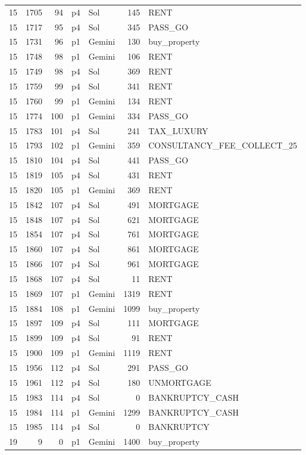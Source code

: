\begin{longtable}{r r r l l r L{2.2in}}
15 & 1705 & 94 & p4 & Sol & 145 & RENT \\
15 & 1717 & 95 & p4 & Sol & 345 & PASS\_GO \\
15 & 1731 & 96 & p1 & Gemini & 130 & buy\_property \\
15 & 1748 & 98 & p1 & Gemini & 106 & RENT \\
15 & 1749 & 98 & p4 & Sol & 369 & RENT \\
15 & 1759 & 99 & p4 & Sol & 341 & RENT \\
15 & 1760 & 99 & p1 & Gemini & 134 & RENT \\
15 & 1774 & 100 & p1 & Gemini & 334 & PASS\_GO \\
15 & 1783 & 101 & p4 & Sol & 241 & TAX\_LUXURY \\
15 & 1793 & 102 & p1 & Gemini & 359 & CONSULTANCY\_FEE\_COLLECT\_25 \\
15 & 1810 & 104 & p4 & Sol & 441 & PASS\_GO \\
15 & 1819 & 105 & p4 & Sol & 431 & RENT \\
15 & 1820 & 105 & p1 & Gemini & 369 & RENT \\
15 & 1842 & 107 & p4 & Sol & 491 & MORTGAGE \\
15 & 1848 & 107 & p4 & Sol & 621 & MORTGAGE \\
15 & 1854 & 107 & p4 & Sol & 761 & MORTGAGE \\
15 & 1860 & 107 & p4 & Sol & 861 & MORTGAGE \\
15 & 1866 & 107 & p4 & Sol & 961 & MORTGAGE \\
15 & 1868 & 107 & p4 & Sol & 11 & RENT \\
15 & 1869 & 107 & p1 & Gemini & 1319 & RENT \\
15 & 1884 & 108 & p1 & Gemini & 1099 & buy\_property \\
15 & 1897 & 109 & p4 & Sol & 111 & MORTGAGE \\
15 & 1899 & 109 & p4 & Sol & 91 & RENT \\
15 & 1900 & 109 & p1 & Gemini & 1119 & RENT \\
15 & 1956 & 112 & p4 & Sol & 291 & PASS\_GO \\
15 & 1961 & 112 & p4 & Sol & 180 & UNMORTGAGE \\
15 & 1983 & 114 & p4 & Sol & 0 & BANKRUPTCY\_CASH \\
15 & 1984 & 114 & p1 & Gemini & 1299 & BANKRUPTCY\_CASH \\
15 & 1985 & 114 & p4 & Sol & 0 & BANKRUPTCY \\
19 & 9 & 0 & p1 & Gemini & 1400 & buy\_property \\

\end{longtable}

